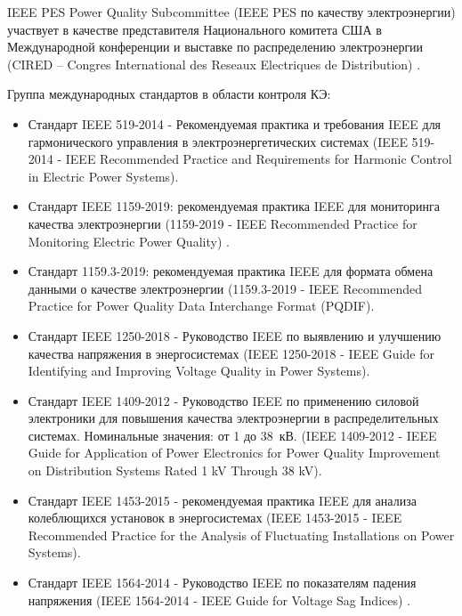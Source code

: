IEEE PES Power Quality Subcommittee (IEEE PES по качеству электроэнергии) участвует в качестве представителя Национального комитета США в Международной конференции и выставке по распределению электроэнергии (CIRED -- Congres International des Reseaux Electriques de Distribution) \cite{CIRED, CIRED_CONFERENCE}. 


Группа международных стандартов в области контроля КЭ:
\begin{itemize}
	\item Стандарт IEEE 519-2014 - Рекомендуемая практика и требования IEEE для гармонического управления в электроэнергетических системах (IEEE 519-2014 - IEEE Recommended Practice and Requirements for Harmonic Control in Electric Power Systems)\cite{IEEE_519-2014}. 
	\item Стандарт IEEE 1159-2019: рекомендуемая практика IEEE для мониторинга качества электроэнергии (1159-2019 - IEEE Recommended Practice for Monitoring Electric Power Quality) \cite{IEEE_1159-2019}. 
	\item Стандарт 1159.3-2019: рекомендуемая практика IEEE для формата обмена данными о качестве электроэнергии (1159.3-2019 - IEEE Recommended Practice for Power Quality Data Interchange Format (PQDIF)\cite{IEEE_1159.3-2019}.
	\item Стандарт IEEE 1250-2018 - Руководство IEEE по выявлению и улучшению качества напряжения в энергосистемах (IEEE 1250-2018 - IEEE Guide for Identifying and Improving Voltage Quality in Power Systems)\cite{IEEE_1250-2018}.
	\item Стандарт IEEE 1409-2012 - Руководство IEEE по применению силовой электроники для повышения качества электроэнергии в распределительных системах. Номинальные значения: от 1 до 38~кВ. (IEEE 1409-2012 - IEEE Guide for Application of Power Electronics for Power Quality Improvement on Distribution Systems Rated 1 kV Through 38 kV)\cite{IEEE_1409-2012}.
	\item Стандарт IEEE 1453-2015 - рекомендуемая практика IEEE для анализа колеблющихся установок в энергосистемах (IEEE 1453-2015 - IEEE Recommended Practice for the Analysis of Fluctuating Installations on Power Systems).
	\item Стандарт IEEE 1564-2014 - Руководство IEEE по показателям падения напряжения (IEEE 1564-2014 - IEEE Guide for Voltage Sag Indices) \cite{IEEE_1453-2015}.
\end{itemize}

